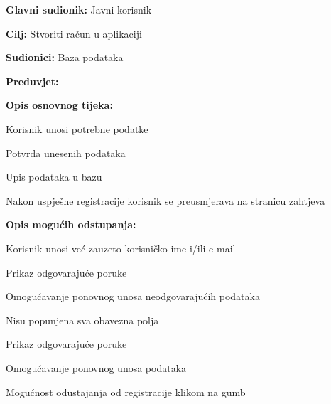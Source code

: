 			\noindent {}
			\begin{packed_item}
				
				\item \textbf{Glavni sudionik: }Javni korisnik
				\item  \textbf{Cilj:} Stvoriti račun u aplikaciji
				\item  \textbf{Sudionici:} Baza podataka
				\item  \textbf{Preduvjet:} -
				\item  \textbf{Opis osnovnog tijeka:}
				
				\item[] \begin{packed_enum}
					
					\item Korisnik unosi potrebne podatke
					\item Potvrda unesenih podataka
					\item Upis podataka u bazu
					\item Nakon uspješne registracije korisnik se preusmjerava na stranicu zahtjeva
				\end{packed_enum}
				
				\item  \textbf{Opis mogućih odstupanja:}
				
				\item[] \begin{packed_item}
					
					\item[1.a] Korisnik unosi već zauzeto korisničko ime i/ili e-mail
					\item[] \begin{packed_enum}
						
						\item Prikaz odgovarajuće poruke
						\item Omogućavanje ponovnog unosa neodgovarajućih podataka
						
					\end{packed_enum}
					\item[1.b] Nisu popunjena sva obavezna polja
					\item[] \begin{packed_enum}
						
						\item Prikaz odgovarajuće poruke
						\item Omogućavanje ponovnog unosa podataka
						
					\end{packed_enum}
					\item[4.a] Mogućnost odustajanja od registracije klikom na gumb
					
				\end{packed_item}
			\end{packed_item}
		
